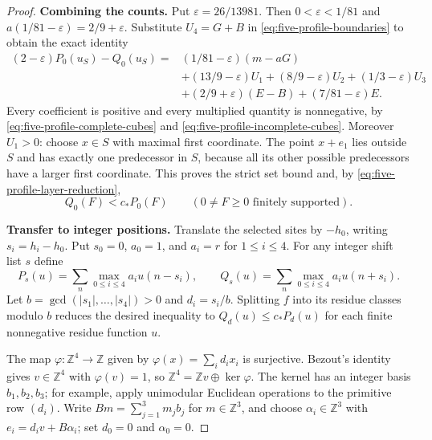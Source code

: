 \begin{proof}
\medskip\noindent\textbf{Combining the counts.}
Put $\varepsilon=26/13981$. Then $0<\varepsilon<1/81$ and
$a(1/81-\varepsilon)=2/9+\varepsilon$. Substitute $U_4=G+B$
in \eqref{eq:five-profile-boundaries} to obtain the exact identity
\[
\begin{aligned}
 (2-\varepsilon)P_0(u_S)-Q_0(u_S)
 ={}&(1/81-\varepsilon)(m-aG)\\
    &+(13/9-\varepsilon)U_1+(8/9-\varepsilon)U_2
       +(1/3-\varepsilon)U_3\\
    &+(2/9+\varepsilon)(E-B)+(7/81-\varepsilon)E.
\end{aligned}
\]
Every coefficient is positive and every multiplied quantity is
nonnegative, by \eqref{eq:five-profile-complete-cubes} and
\eqref{eq:five-profile-incomplete-cubes}. Moreover $U_1>0$:
choose $x\in S$ with maximal first coordinate. The point $x+e_1$
lies outside $S$ and has exactly one predecessor in $S$, because
all its other possible predecessors have a larger first coordinate.
This proves the strict set bound and, by
\eqref{eq:five-profile-layer-reduction},
\begin{equation}\label{eq:five-profile-free-bound}
 Q_0(F)<c_*P_0(F)\qquad(0\ne F\ge0\text{ finitely supported}).
\end{equation}

\medskip\noindent\textbf{Transfer to integer positions.}
Translate the selected sites by $-h_0$, writing $s_i=h_i-h_0$.
Put $s_0=0$, $a_0=1$, and $a_i=r$ for $1\le i\le4$. For any
integer shift list $s$ define
\[
 P_s(u)=\sum_n\max_{0\le i\le4}a_iu(n-s_i),\qquad
 Q_s(u)=\sum_n\max_{0\le i\le4}a_iu(n+s_i).
\]
Let $b=\gcd(|s_1|,\ldots,|s_4|)>0$ and $d_i=s_i/b$.
Splitting $f$ into its residue classes modulo $b$ reduces the desired
inequality to $Q_d(u)\le c_*P_d(u)$ for each finite nonnegative
residue function $u$.

The map $\varphi:\mathbb Z^4\to\mathbb Z$ given by
$\varphi(x)=\sum_i d_ix_i$ is surjective. Bezout's identity gives
$v\in\mathbb Z^4$ with $\varphi(v)=1$, so
$\mathbb Z^4=\mathbb Z v\oplus\ker\varphi$.
The kernel has an integer basis $b_1,b_2,b_3$; for example, apply
unimodular Euclidean operations to the primitive row $(d_i)$.
Write $Bm=\sum_{j=1}^3m_jb_j$ for $m\in\mathbb Z^3$, and choose
$\alpha_i\in\mathbb Z^3$ with $e_i=d_iv+B\alpha_i$; set
$d_0=0$ and $\alpha_0=0$.


\end{proof}

